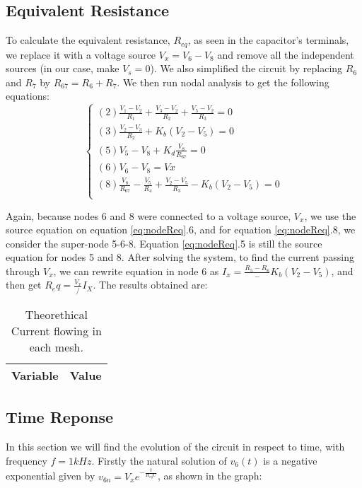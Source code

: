 \subsection{Equivalent Resistance}
To calculate the equivalent resistance, $R_{eq}$, as seen in the capacitor's terminals, we replace it with a voltage source $V_x=V_6-V_8$ and remove all the independent sources (in our case, make $V_s=0$). We also simplified the circuit by replacing $R_6$ and $R_7$ by $R_{67}=R_6+R_7$. We then run nodal analysis to get the following equations:
\begin{equation}\label{eq:nodeReq}
\begin{cases}
  (2) \frac{V_1 - V_2}{R_1} + \frac{V_3 - V_2}{R_2} + \frac{V_5 - V_2}{R_3} = 0 \\
  (3) \frac{V_2 - V_3}{R_2} + K_b(V_2 - V_5) = 0 \\
  (5) V_5 - V_8 + K_d\frac{V_8}{R_{67}} = 0 \\
  (6) V_6 - V_8 = Vx \\
  (8) \frac{V_8}{R_{67}} - \frac{V_5}{R_4} + \frac{V_2 - V_5}{R_3} - K_b(V_2-V_5)= 0 \\
\end{cases}
\end{equation}

Again, because nodes 6 and 8 were connected to a voltage source, $V_x$, we use the source equation on equation \ref{eq:nodeReq}.6, and for equation \ref{eq:nodeReq}.8, we consider the super-node 5-6-8. Equation \ref{eq:nodeReq}.5 is still the source equation for nodes 5 and 8.
After solving the system, to find the current passing through $V_x$, we can rewrite equation in node 6 as $I_x= \frac{R_5 - R_6} - K_b(V_2 - V_5)$, and then get $R_eq=\frac{V_x}/{I_X}$.
The results obtained are:

\begin{table}[H]
  \centering
  \begin{tabular}{|l|r|}
    \hline
        {\bf Variable} & {\bf Value} \\ \hline
        
  \end{tabular}
  \caption{Theorethical Current flowing in each mesh.}
  \label{tab:mesh}
\end{table}


\subsection{Time Reponse}
In this section we will find the evolution of the circuit in respect to time, with frequency $f= 1kHz$.
Firstly the natural solution of $v_6(t)$ is a negative exponential given by $v_{6n}=V_xe^{-\frac{t}{R_{eq}C}}$, as shown in the graph:

